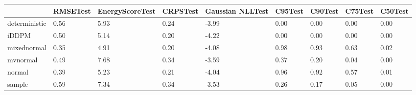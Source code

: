 \begin{tabular}{lllllllll}
\toprule
 & RMSETest & EnergyScoreTest & CRPSTest & Gaussian NLLTest & C95Test & C90Test & C75Test & C50Test \\
\midrule
deterministic & 0.56 & 5.93 & 0.24 & -3.99 & 0.00 & 0.00 & 0.00 & 0.00 \\
iDDPM & 0.50 & 5.14 & 0.20 & -4.22 & 0.00 & 0.00 & 0.00 & 0.00 \\
mixednormal & 0.35 & 4.91 & 0.20 & -4.08 & 0.98 & 0.93 & 0.63 & 0.02 \\
mvnormal & 0.49 & 7.68 & 0.34 & -3.59 & 0.37 & 0.20 & 0.04 & 0.00 \\
normal & 0.39 & 5.23 & 0.21 & -4.04 & 0.96 & 0.92 & 0.57 & 0.01 \\
sample & 0.59 & 7.34 & 0.34 & -3.53 & 0.26 & 0.17 & 0.05 & 0.00 \\
\bottomrule
\end{tabular}
